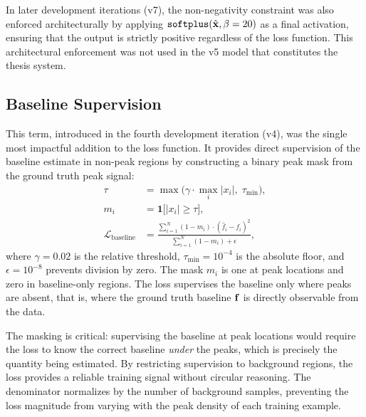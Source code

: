 In later development iterations (v7), the non-negativity constraint was also enforced architecturally by applying $\texttt{softplus}(\hat{\mathbf{x}}, \beta = 20)$ as a final activation, ensuring that the output is strictly positive regardless of the loss function. This architectural enforcement was not used in the v5 model that constitutes the thesis system.


\subsection{Baseline Supervision}
\label{sec:method_loss_baseline}

This term, introduced in the fourth development iteration (v4), was the single most impactful addition to the loss function. It provides direct supervision of the baseline estimate in non-peak regions by constructing a binary peak mask from the ground truth peak signal:
\begin{align}
    \tau &= \max\!\big(\gamma \cdot \max_i |x_i|,\; \tau_{\min}\big), \label{eq:peak_threshold} \\
    m_i &= \mathbf{1}\!\big[|x_i| \geq \tau\big], \label{eq:peak_mask} \\
    \mathcal{L}_{\text{baseline}} &= \frac{\sum_{i=1}^{N} (1 - m_i) \cdot (\hat{f}_i - f_i)^2}{\sum_{i=1}^{N} (1 - m_i) + \epsilon}, \label{eq:baseline_loss}
\end{align}
where $\gamma = 0.02$ is the relative threshold, $\tau_{\min} = 10^{-4}$ is the absolute floor, and $\epsilon = 10^{-8}$ prevents division by zero. The mask $m_i$ is one at peak locations and zero in baseline-only regions. The loss supervises the baseline only where peaks are absent, that is, where the ground truth baseline $\mathbf{f}$ is directly observable from the data.

The masking is critical: supervising the baseline at peak locations would require the loss to know the correct baseline \emph{under} the peaks, which is precisely the quantity being estimated. By restricting supervision to background regions, the loss provides a reliable training signal without circular reasoning. The denominator normalizes by the number of background samples, preventing the loss magnitude from varying with the peak density of each training example.

